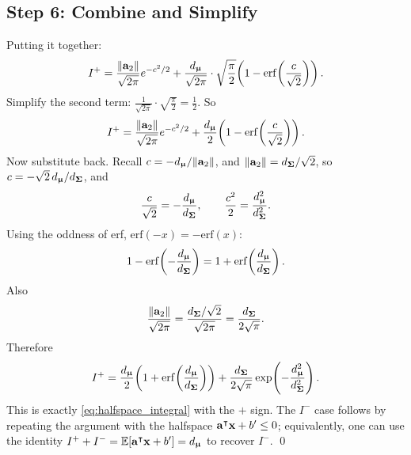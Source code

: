 \documentclass[11pt, letterpaper]{article}
\newcommand{\bSigma}{\vb{\Sigma}}
\newcommand{\bmu}{\boldsymbol{\upmu}}
\newcommand{\E}{\mathbb{E}}
\begin{document}
\subsection{Step 6: Combine and Simplify}

Putting it together:
\begin{equation}
    I^+ = \frac{\|\vb{a}_2\|}{\sqrt{2\pi}}e^{-c^2/2} + \frac{d_{\bmu}}{\sqrt{2\pi}}\cdot\sqrt{\frac{\pi}{2}}\!\left(1 - \mathrm{erf}\!\left(\frac{c}{\sqrt{2}}\right)\right).
\end{equation}
Simplify the second term: $\frac{1}{\sqrt{2\pi}}\cdot\sqrt{\frac{\pi}{2}} = \frac{1}{2}$. So
\begin{equation}
    I^+ = \frac{\|\vb{a}_2\|}{\sqrt{2\pi}}e^{-c^2/2} + \frac{d_{\bmu}}{2}\!\left(1 - \mathrm{erf}\!\left(\frac{c}{\sqrt{2}}\right)\right).
\end{equation}
Now substitute back. Recall $c = -d_{\bmu}/\|\vb{a}_2\|$, and $\|\vb{a}_2\| = d_{\bSigma}/\sqrt{2}$, so $c = -\sqrt{2}\,d_{\bmu}/d_{\bSigma}$, and
\begin{equation}
    \frac{c}{\sqrt{2}} = -\frac{d_{\bmu}}{d_{\bSigma}}, \qquad \frac{c^2}{2} = \frac{d_{\bmu}^2}{d_{\bSigma}^2}.
\end{equation}
Using the oddness of erf, $\mathrm{erf}(-x) = -\mathrm{erf}(x)$:
\begin{equation}
    1 - \mathrm{erf}\!\left(-\frac{d_{\bmu}}{d_{\bSigma}}\right) = 1 + \mathrm{erf}\!\left(\frac{d_{\bmu}}{d_{\bSigma}}\right).
\end{equation}
Also
\begin{equation}
    \frac{\|\vb{a}_2\|}{\sqrt{2\pi}} = \frac{d_{\bSigma}/\sqrt{2}}{\sqrt{2\pi}} = \frac{d_{\bSigma}}{2\sqrt{\pi}}.
\end{equation}
Therefore
\begin{equation}
    I^+ = \frac{d_{\bmu}}{2}\!\left(1 + \mathrm{erf}\!\left(\frac{d_{\bmu}}{d_{\bSigma}}\right)\right) + \frac{d_{\bSigma}}{2\sqrt{\pi}}\exp\!\left(-\frac{d_{\bmu}^2}{d_{\bSigma}^2}\right).
\end{equation}
This is exactly \cref{eq:halfspace_integral} with the $+$ sign. The $I^-$ case follows by repeating the argument with the halfspace $\vb{a}^{\intercal}\vb{x} + b' \leq 0$; equivalently, one can use the identity $I^+ + I^- = \E[\vb{a}^{\intercal}\vb{x} + b'] = d_{\bmu}$ to recover $I^-$. \qed

\pagebreak
\printbibliography
\end{document}
